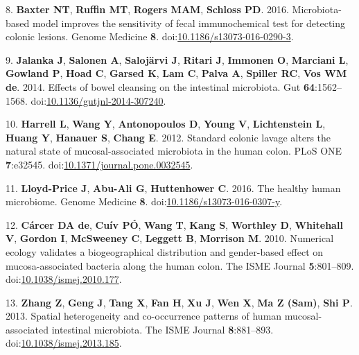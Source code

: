 \documentclass[11pt,]{article}
\begin{document}
\hypertarget{ref-Baxter2016}{}
8. \textbf{Baxter NT}, \textbf{Ruffin MT}, \textbf{Rogers MAM},
\textbf{Schloss PD}. 2016. Microbiota-based model improves the
sensitivity of fecal immunochemical test for detecting colonic lesions.
Genome Medicine \textbf{8}.
doi:\href{https://doi.org/10.1186/s13073-016-0290-3}{10.1186/s13073-016-0290-3}.

\hypertarget{ref-Jalanka2014}{}
9. \textbf{Jalanka J}, \textbf{Salonen A}, \textbf{Salojärvi J},
\textbf{Ritari J}, \textbf{Immonen O}, \textbf{Marciani L},
\textbf{Gowland P}, \textbf{Hoad C}, \textbf{Garsed K}, \textbf{Lam C},
\textbf{Palva A}, \textbf{Spiller RC}, \textbf{Vos WM de}. 2014. Effects
of bowel cleansing on the intestinal microbiota. Gut
\textbf{64}:1562--1568.
doi:\href{https://doi.org/10.1136/gutjnl-2014-307240}{10.1136/gutjnl-2014-307240}.

\hypertarget{ref-Harrell2012}{}
10. \textbf{Harrell L}, \textbf{Wang Y}, \textbf{Antonopoulos D},
\textbf{Young V}, \textbf{Lichtenstein L}, \textbf{Huang Y},
\textbf{Hanauer S}, \textbf{Chang E}. 2012. Standard colonic lavage
alters the natural state of mucosal-associated microbiota in the human
colon. PLoS ONE \textbf{7}:e32545.
doi:\href{https://doi.org/10.1371/journal.pone.0032545}{10.1371/journal.pone.0032545}.

\hypertarget{ref-LloydPrice2016}{}
11. \textbf{Lloyd-Price J}, \textbf{Abu-Ali G}, \textbf{Huttenhower C}.
2016. The healthy human microbiome. Genome Medicine \textbf{8}.
doi:\href{https://doi.org/10.1186/s13073-016-0307-y}{10.1186/s13073-016-0307-y}.

\hypertarget{ref-deCarcer2010}{}
12. \textbf{Cárcer DA de}, \textbf{Cuív PÓ}, \textbf{Wang T},
\textbf{Kang S}, \textbf{Worthley D}, \textbf{Whitehall V},
\textbf{Gordon I}, \textbf{McSweeney C}, \textbf{Leggett B},
\textbf{Morrison M}. 2010. Numerical ecology validates a biogeographical
distribution and gender-based effect on mucosa-associated bacteria along
the human colon. The ISME Journal \textbf{5}:801--809.
doi:\href{https://doi.org/10.1038/ismej.2010.177}{10.1038/ismej.2010.177}.

\hypertarget{ref-Zhang2013}{}
13. \textbf{Zhang Z}, \textbf{Geng J}, \textbf{Tang X}, \textbf{Fan H},
\textbf{Xu J}, \textbf{Wen X}, \textbf{Ma Z (Sam)}, \textbf{Shi P}.
2013. Spatial heterogeneity and co-occurrence patterns of human
mucosal-associated intestinal microbiota. The ISME Journal
\textbf{8}:881--893.
doi:\href{https://doi.org/10.1038/ismej.2013.185}{10.1038/ismej.2013.185}.
\end{document}
